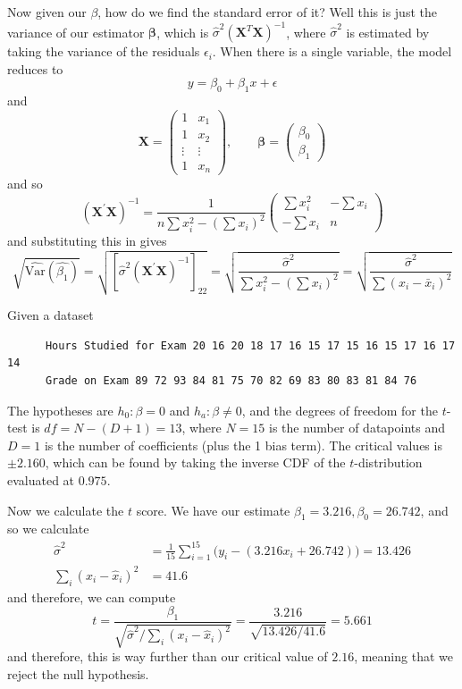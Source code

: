 \documentclass{article}
\begin{document}
      Now given our $\beta$, how do we find the standard error of it? Well this is just the variance of our estimator $\boldsymbol{\beta}$, which is $\hat{\sigma}^2 (\mathbf{X}^T \mathbf{X})^{-1}$, where $\hat{\sigma}^2$ is estimated by taking the variance of the residuals $\epsilon_i$. When there is a single variable, the model reduces to 
      \[y = \beta_0 + \beta_1 x + \epsilon\]
      and 
      \[\mathbf{X} = \left(
      \begin{array}{cc}
      1 & x_1 \\
      1 & x_2 \\
      \vdots & \vdots \\
      1 & x_n
      \end{array}
      \right), \qquad \boldsymbol{\beta} = \left(
      \begin{array}{c}
      \beta_0 \\ \beta_1 
      \end{array}
      \right)\]
      and so 
      \[(\mathbf{X}^{\prime} \mathbf{X})^{-1} = \frac{1}{n\sum x_i^2 - (\sum x_i)^2} 
      \left(
      \begin{array}{cc}
      \sum x_i^2 & -\sum x_i \\
      -\sum x_i  & n
      \end{array}
      \right)\]
      and substituting this in gives 
      \[\sqrt{\widehat{\textrm{Var}}(\hat{\beta_1})} = \sqrt{[\hat{\sigma}^2  (\mathbf{X}^{\prime} \mathbf{X})^{-1}]_{22}} = \sqrt{\frac{\hat{\sigma}^2}{\sum x_i^2 - (\sum x_i)^2}} = \sqrt{\frac{\hat{\sigma}^2}{\sum (x_i - \bar{x}_i)^2}}\]

      \begin{example}
      Given a dataset 
      \begin{verbatim}
      Hours Studied for Exam 20 16 20 18 17 16 15 17 15 16 15 17 16 17 14
      Grade on Exam 89 72 93 84 81 75 70 82 69 83 80 83 81 84 76
      \end{verbatim}
      The hypotheses are $h_0 : \beta = 0$ and $h_a : \beta \neq 0$, and the degrees of freedom for the $t$-test is $df = N - (D + 1) = 13$, where $N = 15$ is the number of datapoints and $D = 1$ is the number of coefficients (plus the 1 bias term). The critical values is $\pm 2.160$, which can be found by taking the inverse CDF of the $t$-distribution evaluated at $0.975$. 

      Now we calculate the $t$ score. We have our estimate $\beta_1 = 3.216, \beta_0 = 26.742$, and so we calculate 
      \begin{align*}
          \hat{\sigma}^2 & = \frac{1}{15} \sum_{i=1}^{15} \big( y_i - (3.216 x_i + 26.742) \big) = 13.426 \\
          \sum_{i} (x_i - \hat{x}_i)^2 & = 41.6 
      \end{align*}
      and therefore, we can compute 
      \[t = \frac{\beta_1}{\sqrt{\hat{\sigma}^2 /  \sum_{i} (x_i - \hat{x}_i)^2}} = \frac{3.216}{\sqrt{13.426/41.6}} = 5.661\]
      and therefore, this is way further than our critical value of $2.16$, meaning that we reject the null hypothesis. 
      \end{example}
\end{document}
